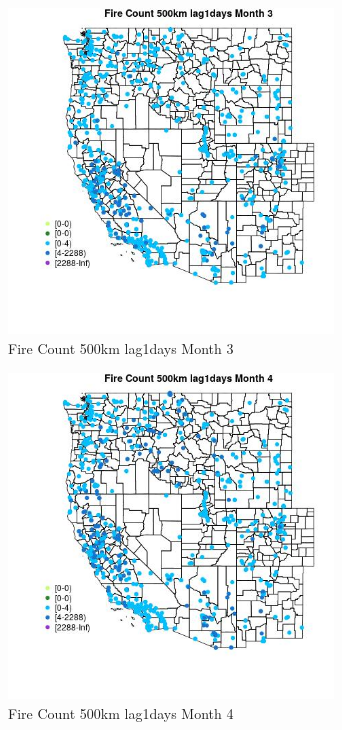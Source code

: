 \begin{figure} 
\centering  
\includegraphics[width=0.77\textwidth]{Code_Outputs/Report_ML_input_PM25_Step4_part_e_de_duplicated_aves_compiled_2019-05-21wNAs_MapObsMo3Fire_Count_500km_lag1days.jpg} 
\caption{\label{fig:Report_ML_input_PM25_Step4_part_e_de_duplicated_aves_compiled_2019-05-21wNAsMapObsMo3Fire_Count_500km_lag1days}Fire Count 500km lag1days Month 3} 
\end{figure} 
 

\clearpage 

\begin{figure} 
\centering  
\includegraphics[width=0.77\textwidth]{Code_Outputs/Report_ML_input_PM25_Step4_part_e_de_duplicated_aves_compiled_2019-05-21wNAs_MapObsMo4Fire_Count_500km_lag1days.jpg} 
\caption{\label{fig:Report_ML_input_PM25_Step4_part_e_de_duplicated_aves_compiled_2019-05-21wNAsMapObsMo4Fire_Count_500km_lag1days}Fire Count 500km lag1days Month 4} 
\end{figure} 
 

